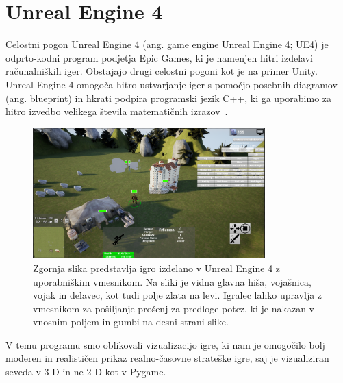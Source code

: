 \documentclass[a4paper, 12pt]{book}
\begin{document}
\section{Unreal Engine 4}
\label{UnrealEngine}

Celostni pogon Unreal Engine 4 (ang. game engine Unreal Engine 4; UE4) je odprto-kodni program podjetja Epic Games, ki je namenjen hitri izdelavi računalniških iger. 
Obstajajo drugi celostni pogoni kot je na primer Unity.\\
Unreal Engine 4 omogoča hitro ustvarjanje iger s pomočjo posebnih diagramov (ang. blueprint) in hkrati podpira programski jezik C++, ki ga uporabimo za hitro izvedbo velikega števila matematičnih izrazov~\cite{diploma2}.

\begin{figure}[h!]
	\begin{center}
		\includegraphics[width=0.8\textwidth]{photos/ue4-widget.pdf}
	\end{center}
	\caption{Zgornja slika predstavlja igro izdelano v Unreal Engine 4 z uporabniškim vmesnikom. Na sliki je vidna glavna hiša, vojašnica, vojak in delavec, kot tudi polje zlata na levi. Igralec lahko upravlja z vmesnikom za pošiljanje prošenj za predloge potez, ki je nakazan v vnosnim poljem in gumbi na desni strani slike. }
	\label{ue4-game}
\end{figure}

V temu programu smo oblikovali vizualizacijo igre, ki nam je omogočilo bolj moderen in realističen prikaz realno-časovne strateške igre, saj je vizualiziran seveda v 3-D in ne 2-D kot v Pygame.
\end{document}

